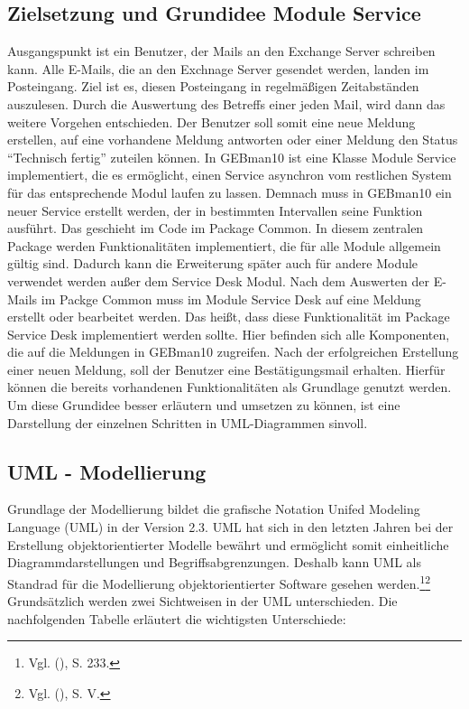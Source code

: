 \subsection{Zielsetzung und Grundidee Module Service }
\noindent
Ausgangspunkt ist ein Benutzer, der Mails an den Exchange Server schreiben kann. Alle E-Mails, die an den Exchnage Server gesendet werden, landen im Posteingang. Ziel ist es, diesen Posteingang in regelmäßigen Zeitabständen auszulesen. Durch die Auswertung des Betreffs einer jeden Mail, wird dann das weitere Vorgehen entschieden. Der Benutzer soll somit eine neue Meldung erstellen, auf eine vorhandene Meldung antworten oder einer Meldung den Status \enquote{Technisch fertig} zuteilen können.\newline 
In GEBman10  ist eine Klasse Module Service implementiert, die es ermöglicht, einen Service asynchron vom restlichen System für das entsprechende Modul laufen zu lassen. Demnach muss in GEBman10 ein neuer Service erstellt werden, der in bestimmten Intervallen seine Funktion ausführt. Das geschieht im Code im Package Common. In diesem zentralen Package werden Funktionalitäten implementiert, die für alle Module allgemein gültig sind. Dadurch kann die Erweiterung später auch für andere Module verwendet werden außer dem Service Desk Modul.\newline
Nach dem Auswerten der E-Mails im Packge Common muss im Module Service Desk auf eine Meldung erstellt oder bearbeitet werden. Das heißt, dass diese Funktionalität im Package Service Desk implementiert werden sollte. Hier befinden sich alle Komponenten, die auf die Meldungen in GEBman10 zugreifen. Nach der erfolgreichen Erstellung einer neuen Meldung, soll der Benutzer eine Bestätigungsmail erhalten. Hierfür können die bereits vorhandenen Funktionalitäten als Grundlage genutzt werden.\newline
Um diese Grundidee besser erläutern und umsetzen zu können, ist eine Darstellung der einzelnen Schritten in UML-Diagrammen sinvoll.



\subsection{UML - Modellierung}
\noindent
Grundlage der Modellierung bildet die grafische Notation Unifed Modeling Language (UML) in der Version 2.3. UML hat sich in den letzten Jahren bei der Erstellung objektorientierter Modelle bewährt und ermöglicht somit einheitliche Diagrammdarstellungen und Begriffsabgrenzungen. Deshalb kann UML als Standrad für die Modellierung objektorientierter Software gesehen werden.\footnote{Vgl. \citeauthor{Schneider} (\citeyear{Schneider}), S. 233.}\footnote{Vgl. \citeauthor{Balzert} (\citeyear{Balzert}), S. V.} \newline
Grundsätzlich werden zwei Sichtweisen in der UML unterschieden. Die nachfolgenden Tabelle erläutert die wichtigsten Unterschiede:

